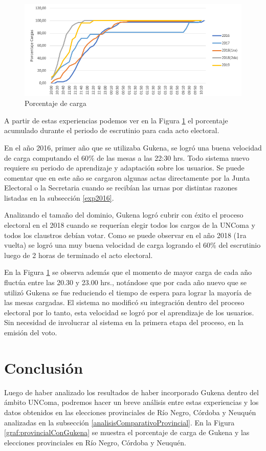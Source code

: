 \begin{figure}[h!]
    \begin{center}
        \includegraphics[width=\textwidth]{img/experienciasPorcCarga.png}
    \end{center}
  \caption{Porcentaje de carga}
  \label{graf:experienciaPorcCarga}
\end{figure}
A partir de estas experiencias podemos ver en la Figura \ref{graf:experienciaPorcCarga} el porcentaje acumulado durante el periodo de escrutinio para cada acto electoral.

En el año 2016, primer año que se utilizaba Gukena, se logró una buena velocidad de carga computando el 60\% de las mesas a las 22:30 hrs. Todo sistema nuevo requiere su periodo de aprendizaje y adaptación sobre los usuarios. Se puede comentar que en este año se cargaron algunas actas directamente por la Junta Electoral o la Secretaria cuando se recibían las urnas por distintas razones listadas en la subsección \ref{exp2016}. 

Analizando el tamaño del dominio, Gukena logró cubrir con éxito el proceso electoral en el 2018 cuando se requerían elegir todos los cargos de la UNComa y todos los claustros debían votar. Como se puede observar en el año 2018 (1ra vuelta) se logró una muy buena velocidad de carga logrando el 60\% del escrutinio luego de 2 horas de terminado el acto electoral.

En la Figura \ref{graf:experienciaPorcCarga} se observa además que el momento de mayor carga de cada año fluctúa entre las 20.30 y 23.00 hrs., notándose que por cada año nuevo que se utilizó Gukena se fue reduciendo el tiempo de espera para lograr la mayoría de las mesas cargadas. El sistema no modificó su integración dentro del proceso electoral por lo tanto, esta velocidad se logró por el aprendizaje de los usuarios. Sin necesidad de involucrar al sistema en la primera etapa del proceso, en la emisión del voto.

\section{Conclusión}
Luego de haber analizado los resultados de haber incorporado Gukena dentro del ámbito UNComa, podremos hacer un breve análisis entre estas experiencias y los datos obtenidos en las elecciones provinciales de Río Negro, Córdoba y Neuquén analizadas en la subsección \ref{analisisComparativoProvincial}. En la Figura \ref{graf:provincialConGukena} se muestra el porcentaje de carga de Gukena y las elecciones provinciales en Río Negro, Córdoba y Neuquén.

